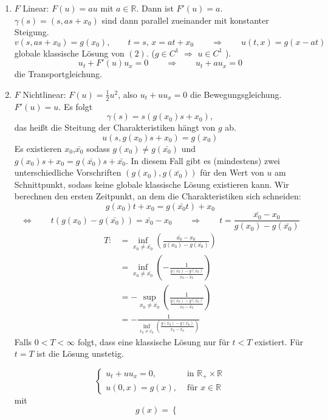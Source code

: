 \begin{enumerate}[1.)]
	\item $F$ Linear: $F(u) = au$ mit $a \in \mathbb{R}$. Dann ist $F'(u) = a$.
	$\gamma(s)=(s,as+x_0)$ sind dann parallel zueinander mit konstanter Steigung.
	\[
		v(s,as+x_0) = g(x_0), \qquad t=s, \, x=at+x_0 \qquad \Rightarrow \qquad u(t,x) = g(x-at)
	\]
	globale klassische Lösung von $(2)$. ($g \in C^1$ $\Rightarrow$ $u \in C^1$ ). \\
	\[
		u_t + F'(u) u_x =0 \qquad \Rightarrow \qquad u_t+ a u_x =0 
	\]
	die Transportgleichung.
	\item $F$ Nichtlinear: $F(u)= \frac{1}{2} u^2$, also $u_t + u u_x = 0$ die Bewegungsgleichung. $F'(u)=u$. Es folgt
	\[
		\gamma(s) = s(g(x_0)s+x_0),
	\]
 	das heißt die Steitung der Charakteristiken hängt von $g$ ab.
	\[
		u(s,g(x_0)s+x_0) = g(x_0)
	\]
	Es existieren $x_0$,$\bar{x_0}$ sodass $g(x_0) \neq g(\bar{x_0})$ und $g(x_0)s+ x_0 = g(\bar{x_0})s + \bar{x_0}$. In diesem Fall gibt es (mindestens) zwei unterschiedliche Vorschriften $(g(x_0),g(\bar{x_0}))$ für den Wert von $u$ am Schnittpunkt, sodass keine globale klassische Lösung existieren kann. Wir berechnen den ersten Zeitpunkt, an dem die Charakteristiken sich schneiden:
	\[
		g(x_0)t + x_0 = g(\bar{x_0}t)+ x_0
	\]
	\[
		\Leftrightarrow \qquad t(g(x_0)-g(\bar{x_0})) = \bar{x_0}-x_0 \qquad \Rightarrow \qquad t = \frac{\bar{x_0}-x_0}{g(x_0)-g(\bar{x_0})}
	\]
	\begin{align*}
		T:&= \inf_{x_0 \neq \bar{x_0}} \left( \frac{\bar{x_0}-x_0}{g(x_0)-g(\bar{x_0})} \right) \\
		&= \inf_{x_0 \neq \bar{x_0}} \left( - \frac{1}{\frac{g(x_0)- g(\bar{x_0})}{x_0-\bar{x_0}}} \right) \\
		& = - \sup_{x_0 \neq \bar{x_0}} \left( \frac{1}{\frac{g(x_0)-g(\bar{x_0})}{x_0-\bar{x_0}}} \right) \\
		&= - \frac{1}{\inf_{x_0 \neq \bar{x_0}}\left( \frac{g(x_0)-g(\bar{x_0})}{x_0-\bar{x_0}} \right)}
	\end{align*}
	Falls $0 < T < \infty$ folgt, dass eine klassische Lösung nur für $t < T$ existiert. Für $t=T$ ist die Lösung unstetig.
	\begin{beispiel}
		\[
			\begin{cases}
				u_t + uu_x = 0, &\text{ in }\mathbb{R}_+ \times \mathbb{R}\\
				u(0,x) = g(x), & \text{ für } x \in \mathbb{R}
			\end{cases}
		\]
		mit
		\[
			g(x) = \begin{cases}

\end{cases}\]
\end{beispiel}
\end{enumerate}
